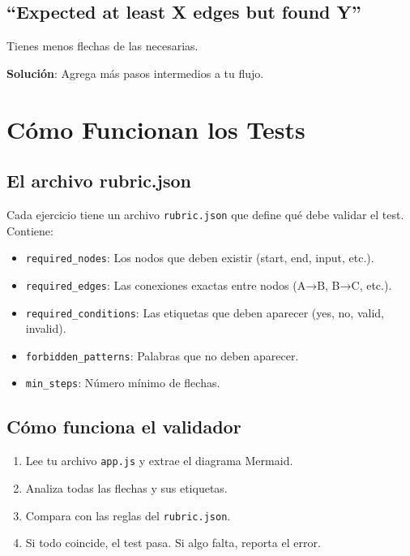 \documentclass[12pt]{article}
\begin{document}
\subsection{``Expected at least X edges but found Y''}

Tienes menos flechas de las necesarias.

\textbf{Solución}: Agrega más pasos intermedios a tu flujo.

\newpage

\section{Cómo Funcionan los Tests}

\subsection{El archivo rubric.json}

Cada ejercicio tiene un archivo \texttt{rubric.json} que define qué debe validar el test. Contiene:

\begin{itemize}
    \item \texttt{required\_nodes}: Los nodos que deben existir (start, end, input, etc.).
    \item \texttt{required\_edges}: Las conexiones exactas entre nodos (A→B, B→C, etc.).
    \item \texttt{required\_conditions}: Las etiquetas que deben aparecer (yes, no, valid, invalid).
    \item \texttt{forbidden\_patterns}: Palabras que no deben aparecer.
    \item \texttt{min\_steps}: Número mínimo de flechas.
\end{itemize}

\subsection{Cómo funciona el validador}

\begin{enumerate}
    \item Lee tu archivo \texttt{app.js} y extrae el diagrama Mermaid.
    \item Analiza todas las flechas y sus etiquetas.
    \item Compara con las reglas del \texttt{rubric.json}.
    \item Si todo coincide, el test pasa. Si algo falta, reporta el error.
\end{enumerate}
\end{document}
